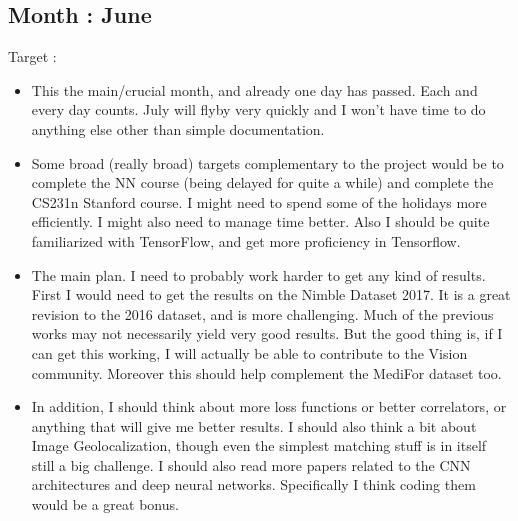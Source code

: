 \documentclass{article}
\begin{document}
\subsection{Month : June}
Target :
\begin{itemize}
\item This the main/crucial month, and already one day has passed. Each and every day counts. July will flyby very quickly and I won't have time to do anything else other than simple documentation.
\item Some broad (really broad) targets complementary to the project would be to complete the NN course (being delayed for quite a while) and complete the CS231n Stanford course. I might need to spend some of the holidays more efficiently. I might also need to manage time better. Also I should be quite familiarized with TensorFlow, and get more proficiency in Tensorflow.
\item The main plan. I need to probably work harder to get any kind of results. First I would need to get the results on the Nimble Dataset 2017. It is a great revision to the 2016 dataset, and is more challenging. Much of the previous works may not necessarily yield very good results. But the good thing is, if I can get this working, I will actually be able to contribute to the Vision community. Moreover this should help complement the MediFor dataset too.
\item In addition, I should think about more loss functions or better correlators, or anything that will give me better results. I should also think a bit about Image Geolocalization, though even the simplest matching stuff is in itself still a big challenge. I should also read more papers related to the CNN architectures and deep neural networks. Specifically I think coding them would be a great bonus.
\end{itemize}
\end{document}
